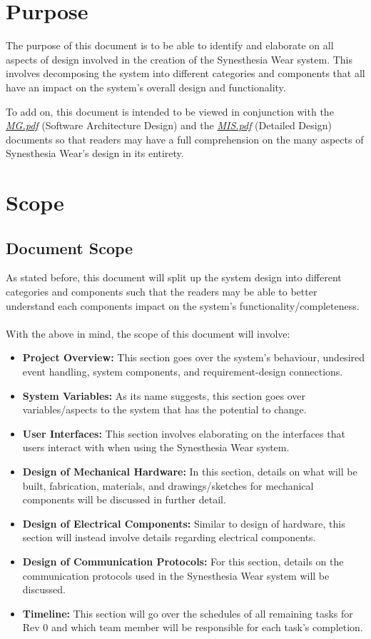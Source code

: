 \documentclass[12pt, titlepage]{article}
\begin{document}
\section{Purpose}
The purpose of this document is to be able to identify and elaborate on all aspects of design involved
in the creation of the Synesthesia Wear system. This involves decomposing the system into different categories and components 
that all have an impact on the system's overall design and functionality.

To add on, this document is intended to be viewed in conjunction with the \href{https://github.com/jordanbierbrier/capstone/blob/main/docs/Design/SoftArchitecture/MG.pdf}{\textit{MG.pdf}} (Software Architecture Design) 
and the \href{https://github.com/jordanbierbrier/capstone/blob/main/docs/Design/SoftDetailedDes/MIS.pdf}{\textit{MIS.pdf}} (Detailed Design) documents so that readers may have a full comprehension on the many aspects of Synesthesia 
Wear's design in its entirety. 

\section{Scope}
\subsection {Document Scope}
As stated before, this document will split up the system design into different categories and components 
such that the readers may be able to better understand each components impact on the system's functionality/completeness.\\\\
\noindent With the above in mind, the scope of this document will involve:
\begin{itemize}
  \item \textbf{Project Overview:} This section goes over the system's behaviour, undesired event handling, system components, and requirement-design connections.  
  \item \textbf{System Variables:} As its name suggests, this section goes over variables/aspects to the system that has the potential to change.
  \item \textbf{User Interfaces:} This section involves elaborating on the interfaces that users interact with when using the Synesthesia Wear system.
  \item \textbf{Design of Mechanical Hardware:} In this section, details on what will be built, fabrication, materials, and drawings/sketches for mechanical components will be discussed in further detail. 
  \item \textbf{Design of Electrical Components:} Similar to design of hardware, this section will instead involve details regarding electrical components.
  \item \textbf{Design of Communication Protocols:} For this section, details on the communication protocols used in the Synesthesia Wear system will be discussed.
  \item \textbf{Timeline:} This section will go over the schedules of all remaining tasks for Rev 0 and which team member will be responsible for each task's completion.
\end{itemize}
\end{document}
